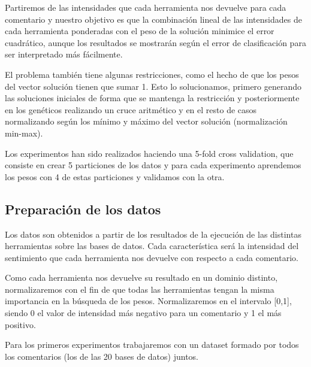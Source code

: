 \documentclass{article}
\begin{document}
Partiremos de las intensidades que cada herramienta nos devuelve para cada comentario y nuestro objetivo es que la combinación lineal de las intensidades de cada herramienta ponderadas con el peso de la solución minimice el error cuadrático, aunque los resultados se mostrarán según el error de clasificación para ser interpretado más fácilmente.

El problema también tiene algunas restricciones, como el hecho de que los pesos del vector solución tienen que sumar 1. Esto lo solucionamos, primero generando las soluciones iniciales de forma que se mantenga la restricción y posteriormente en los genéticos realizando un cruce aritmético y en el resto de casos normalizando según los mínimo y máximo del vector solución (normalización min-max).


Los experimentos han sido realizados haciendo una 5-fold cross validation, que consiste en crear 5 particiones de los datos y para cada experimento aprendemos los pesos con 4 de estas particiones y validamos con la otra.
\subsection{Preparación de los datos}
Los datos son obtenidos a partir de los resultados de la ejecución de las distintas herramientas sobre las bases de datos. Cada característica será la intensidad del sentimiento que cada herramienta nos devuelve con respecto a cada comentario.

Como cada herramienta nos devuelve su resultado en un dominio distinto, normalizaremos con el fin de que todas las herramientas tengan la misma importancia en la búsqueda de los pesos. Normalizaremos en el intervalo [0,1], siendo 0 el valor de intensidad más negativo para un comentario y 1 el más positivo.

Para los primeros experimentos trabajaremos con un dataset formado por todos los comentarios (los de las 20 bases de datos) juntos.
\end{document}
